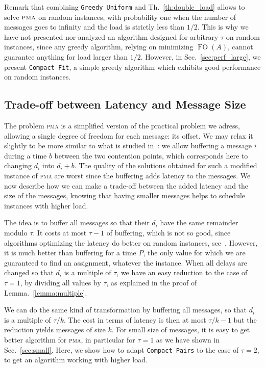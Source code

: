 \documentclass[a4paper,UKenglish,cleveref, autoref, thm-restate]{lipics-v2019}
\DeclareMathOperator{\Fo}{FO}
\newcommand\pma{\textsc{pma}\xspace}
\newcommand\compactpair{\texttt{Compact Pairs}\xspace}
\newcommand\greedyuniform{\texttt{Greedy Uniform}\xspace}
\newcommand\compactfit{\texttt{Compact Fit}\xspace}
\begin{document}
Remark that combining \greedyuniform and Th.~\ref{th:double_load} allows to solve $\pma$ on random instances, with probability one when the number of messages goes to infinity and the load is strictly less than $1/2$. 
This is why we have not presented nor analyzed an algorithm designed for arbitrary $\tau$ on random instances, since any greedy algorithm, relying on minimizing $\Fo(A)$, cannot guarantee anything for load larger than $1/2$. However, in Sec.~\ref{sec:perf_large}, we present \compactfit, a simple greedy algorithm which exhibits good performance on random instances.

\subsection{Trade-off between Latency and Message Size}

The problem \pma is a simplified version of the practical problem we adress, allowing a single degree of freedom for each message: its offset. We may relax it slightly to be more similar to what is studied in~\cite{barth2018deterministic}: we allow buffering a message $i$ during a time $b$ between the two contention points, which corresponds here to changing $d_i$ into $d_i + b$. The quality of the solutions obtained for such a modified instance of \pma are worst since the buffering adds latency to the messages. We now describe how we can make a trade-off between the added latency and the size of the messages, knowing that having smaller messages helps to schedule instances with higher load.

The idea is to buffer all messages so that their $d_i$ have the same
remainder modulo $\tau$. It costs at most $\tau - 1$ of buffering, which is not
so good, since algorithms optimizing the latency do better on random instances, see~\cite{barth2018deterministic}. However, it is much better than buffering for a time $P$, the only value for which we are guaranteed to find an assignment, whatever the instance. When all delays are changed so that $d_i$ is a multiple of $\tau$, we have an easy reduction to the case of $\tau = 1$, by dividing all values by $\tau$, as explained in the proof of Lemma.~\ref{lemma:multiple}.


We can do the same kind of transformation by buffering all messages, so that $d_i$ is a multiple of $\tau / k$. The cost in terms of latency is then at most $\tau / k - 1$ but the reduction yields messages of size $k$.
For small size of messages, it is easy to get better algorithm for \pma, in particular for $\tau = 1$ as we have shown in Sec.~\ref{sec:small}. Here, we show how to adapt \compactpair to the case of $\tau = 2$, to get an algorithm working with higher load.
\end{document}
